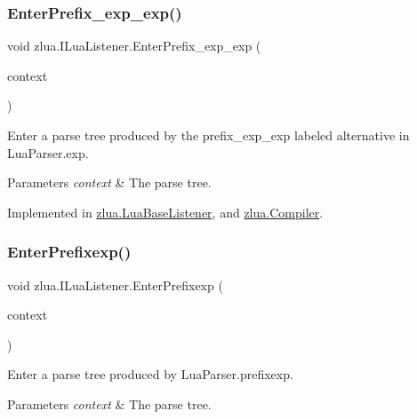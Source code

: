 \subsubsection{\texorpdfstring{Enter\+Prefix\+\_\+exp\+\_\+exp()}{EnterPrefix\_exp\_exp()}}
{\footnotesize\ttfamily void zlua.\+I\+Lua\+Listener.\+Enter\+Prefix\+\_\+exp\+\_\+exp (\begin{DoxyParamCaption}\item[{\mbox{[}\+Not\+Null\mbox{]} \mbox{\hyperlink{classzlua_1_1_lua_parser_1_1_prefix__exp__exp_context}{Lua\+Parser.\+Prefix\+\_\+exp\+\_\+exp\+Context}}}]{context }\end{DoxyParamCaption})}



Enter a parse tree produced by the {\ttfamily prefix\+\_\+exp\+\_\+exp} labeled alternative in Lua\+Parser.\+exp. 


\begin{DoxyParams}{Parameters}
{\em context} & The parse tree.\\
\hline
\end{DoxyParams}


Implemented in \mbox{\hyperlink{classzlua_1_1_lua_base_listener_aa1c31e6fda9d54bd984d3d5d5c0ff8ed}{zlua.\+Lua\+Base\+Listener}}, and \mbox{\hyperlink{classzlua_1_1_compiler_ad48048f780b0cb63ea44f0e45f26ddea}{zlua.\+Compiler}}.

\mbox{\label{interfacezlua_1_1_i_lua_listener_a77ffdad769c7c8266a678e93c529cdf6}} 
\subsubsection{\texorpdfstring{Enter\+Prefixexp()}{EnterPrefixexp()}}
{\footnotesize\ttfamily void zlua.\+I\+Lua\+Listener.\+Enter\+Prefixexp (\begin{DoxyParamCaption}\item[{\mbox{[}\+Not\+Null\mbox{]} \mbox{\hyperlink{classzlua_1_1_lua_parser_1_1_prefixexp_context}{Lua\+Parser.\+Prefixexp\+Context}}}]{context }\end{DoxyParamCaption})}



Enter a parse tree produced by Lua\+Parser.\+prefixexp. 


\begin{DoxyParams}{Parameters}
{\em context} & The parse tree.\\
\hline
\end{DoxyParams}


